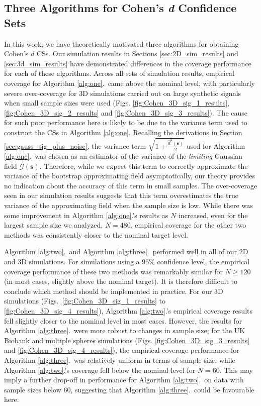 \subsection{Three Algorithms for Cohen's \textit{d} Confidence Sets}
In this work, we have theoretically motivated three algorithms for obtaining Cohen's $d$ CSs. Our simulation results in Sections \ref{sec:2D_sim_results} and \ref{sec:3d_sim_results} have demonstrated differences in the coverage performance for each of these algorithms. Across all sets of simulation results, empirical coverage for Algorithm \ref{alg:one}.\ came above the nominal level, with particularly severe over-coverage for 3D simulations carried out on large synthetic signals when small sample sizes were used (Figs. \ref{fig:Cohen_3D_sig_1_results}, \ref{fig:Cohen_3D_sig_2_results} and \ref{fig:Cohen_3D_sig_3_results}). The cause for such poor performance here is likely to be due to the variance term used to construct the CSs in Algorithm \ref{alg:one}. Recalling the derivations in Section \ref{sec:gauss_sig_plus_noise}, the variance term $\sqrt{1 + \frac{\hat{d}^{2}(\bm{s})}{2}}$ used for Algorithm \ref{alg:one}.\ was chosen as an estimator of the variance of the \textit{limiting} Gaussian field $\mathcal{G}(\bm{s})$. Therefore, while we expect this term to correctly approximate the variance of the bootstrap approximating field asymptotically, our theory provides no indication about the accuracy of this term in small samples. The over-coverage seen in our simulation results suggests that this term overestimates the true variance of the approximating field when the sample size is low. While there was some improvement in Algorithm \ref{alg:one}.'s results as $N$ increased, even for the largest sample size we analyzed, $N = 480$, empirical coverage for the other two methods was consistently closer to the nominal target level. 

Algorithm \ref{alg:two}.\ and Algorithm \ref{alg:three}.\ performed well in all of our 2D and 3D simulations. For simulations using a $95\%$ confidence level, the empirical coverage performance of these two methods was remarkably similar for $N \geq 120$ (in most cases, slightly above the nominal target). It is therefore difficult to conclude which method should be implemented in practice. For our 3D simulations (Figs.\ \ref{fig:Cohen_3D_sig_1_results} to \ref{fig:Cohen_3D_sig_4_results}), Algorithm \ref{alg:two}.'s empirical coverage results fell slightly closer to the nominal level in most cases. However, the results for Algorithm \ref{alg:three}.\ were more robust to changes in sample size; for the UK Biobank and multiple spheres simulations (Figs. \ref{fig:Cohen_3D_sig_3_results} and \ref{fig:Cohen_3D_sig_4_results}), the empirical coverage performance for Algorithm \ref{alg:three}.\ was relatively uniform in terms of sample size, while Algorithm \ref{alg:two}.'s coverage fell below the nominal level for $N = 60$. This may imply a further drop-off in performance for Algorithm \ref{alg:two}.\ on data with sample sizes below 60, suggesting that Algorithm \ref{alg:three}.\ could be favourable here. 

